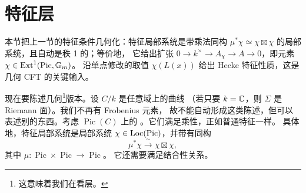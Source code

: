 
\section{特征层}


\begin{sectionkey}
本节把上一节的特征条件几何化：特征局部系统是带乘法同构
$\mu^*\chi\simeq\chi\boxtimes\chi$ 的局部系统，且自动是秩 1 的；等价地，
它给出扩张 $0\to k^\times\to A_\chi\to A\to0$，即元素 $\chi\in\operatorname{Ext}^1(\operatorname{Pic},\mathbb{G}_m)$。
沿单点修改的取值 $\chi(L(x))$ 给出 Hecke 特征性质，这是几何 CFT 的关键输入。
\end{sectionkey}

现在要陈述几何\footnote{这意味着我们在看层。}版本。设 $C/k$ 是任意域上的曲线
（若只要 $k=\mathbb{C}$，则 $\Sigma$ 是 Riemann 面）。我们不再有 Frobenius 元素，
故不能自动形成这类陈述，但可以表述别的东西。考虑 $\operatorname{Pic}(C)$ 上的
。它们满足乘性，正如普通特征一样。
具体地，特征局部系统是局部系统 $\chi\in\mathrm{Loc}(\operatorname{Pic})$，并带有同构
\begin{equation}\tag{7.21}\label{eq:7.21}
\mu^*\chi\xrightarrow{\ \sim\ }\chi\boxtimes\chi,
\end{equation}
其中 $\mu\colon\operatorname{Pic}\times\operatorname{Pic}\to\operatorname{Pic}$。
它还需要满足结合性关系。

